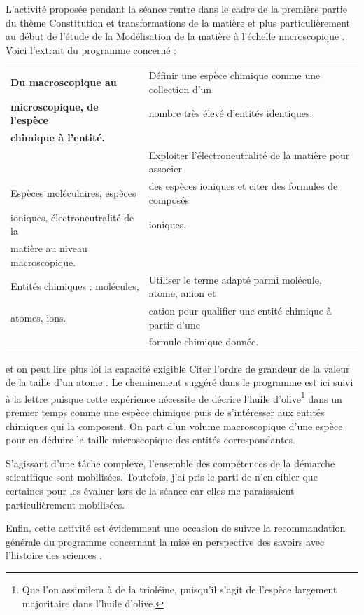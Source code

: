 \documentclass[12pt,a4paper, fleqn]{report}
\begin{document}
L'activité proposée pendant la séance rentre dans le cadre de la première partie du thème \og Constitution et transformations de la matière \fg{} et plus particulièrement au début de l'étude de la \og Modélisation de la matière à l'échelle microscopique \fg{}.
Voici l'extrait du programme concerné :
\begin{center}
\begin{tabular}{|l|l|}
\hline
\textbf{Du macroscopique au} 			& Définir une espèce chimique comme une collection d'un \\
\textbf{microscopique, de l'espèce}	& nombre très élevé d'entités identiques. \\
\textbf{chimique à l'entité.}					& \\
																& Exploiter l'électroneutralité de la matière pour associer\\
Espèces moléculaires, espèces		& des espèces ioniques et citer des formules de composés\\
ioniques, électroneutralité de la			& ioniques.\\
matière au niveau	 macroscopique.	& \\
\hline
Entités chimiques : molécules,			& Utiliser le terme adapté parmi molécule, atome, anion et \\
atomes, ions.											& cation pour qualifier une entité chimique à partir d'une \\
																& formule chimique donnée. \\
\hline
\end{tabular}
\end{center}
et on peut lire plus loi la capacité exigible \og Citer l'ordre de grandeur de la valeur de la taille d'un atome \fg{}.
Le cheminement suggéré dans le programme est ici suivi à la lettre puisque cette expérience nécessite de décrire l'huile d'olive\footnote{Que l'on assimilera à de la trioléine, puisqu'il s'agit de l'espèce largement majoritaire dans l'huile d'olive.} dans un premier temps comme une espèce chimique puis de s'intéresser aux entités chimiques qui la composent.
On part d'un volume macroscopique d'une espèce pour en déduire la taille microscopique des entités correspondantes.

S'agissant d'une tâche complexe, l'ensemble des compétences de la démarche scientifique sont mobilisées.
Toutefois, j'ai pris le parti de n'en cibler que certaines pour les évaluer lors de la séance car elles me paraissaient particulièrement mobilisées.

Enfin, cette activité est évidemment une occasion de suivre la recommandation générale du programme concernant la \og mise en perspective des savoirs avec l'histoire des sciences \fg{}.
\end{document}
